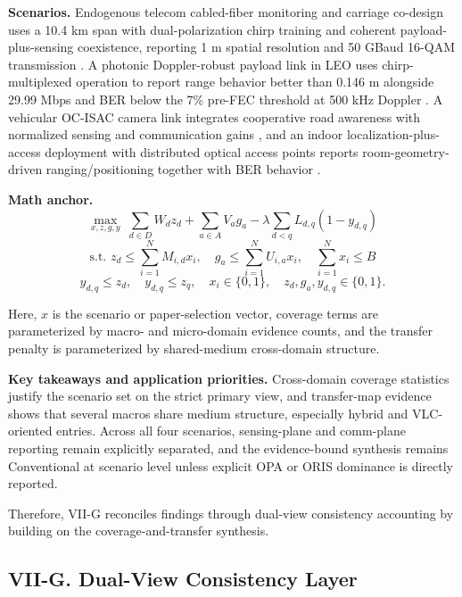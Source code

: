 \textbf{Scenarios.} Endogenous telecom cabled-fiber monitoring and carriage co-design uses a 10.4 km span with dual-polarization chirp training and coherent payload-plus-sensing coexistence, reporting 1 m spatial resolution and 50 GBaud 16-QAM transmission \cite{O_ISAC_074}. A photonic Doppler-robust payload link in LEO uses chirp-multiplexed operation to report range behavior better than 0.146 m alongside 29.99 Mbps and BER below the 7\% pre-FEC threshold at 500 kHz Doppler \cite{O_ISAC_187}. A vehicular OC-ISAC camera link integrates cooperative road awareness with normalized sensing and communication gains \cite{O_ISAC_164}, and an indoor localization-plus-access deployment with distributed optical access points reports room-geometry-driven ranging/positioning together with BER behavior \cite{O_ISAC_011,O_ISAC_108}.

\textbf{Math anchor.}
\[
\max_{x,z,g,y}\; \sum_{d \in D} W_d z_d + \sum_{a \in A} V_a g_a - \lambda \sum_{d<q} L_{d,q}(1-y_{d,q})
\]
\[
\text{s.t. } z_d \le \sum_{i=1}^{N} M_{i,d}x_i,\quad g_a \le \sum_{i=1}^{N} U_{i,a}x_i,\quad \sum_{i=1}^{N}x_i \le B
\]
\[
y_{d,q}\le z_d,\quad y_{d,q}\le z_q,\quad x_i \in \{0,1\},\quad z_d,g_a,y_{d,q}\in\{0,1\}.
\]

Here, $x$ is the scenario or paper-selection vector, coverage terms are parameterized by macro- and micro-domain evidence counts, and the transfer penalty is parameterized by shared-medium cross-domain structure.

\textbf{Key takeaways and application priorities.} Cross-domain coverage statistics justify the scenario set on the strict primary view, and transfer-map evidence shows that several macros share medium structure, especially hybrid and VLC-oriented entries. Across all four scenarios, sensing-plane and comm-plane reporting remain explicitly separated, and the evidence-bound synthesis remains Conventional at scenario level unless explicit OPA or ORIS dominance is directly reported.

Therefore, VII-G reconciles findings through dual-view consistency accounting by building on the coverage-and-transfer synthesis.

\subsection{VII-G. Dual-View Consistency Layer}

